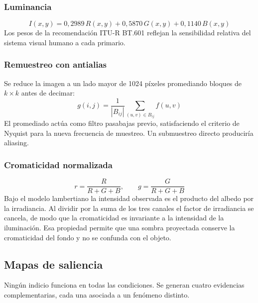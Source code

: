 \documentclass[conference]{IEEEtran}
\begin{document}
\subsubsection{Luminancia}
\begin{equation}
I(x,y) = 0{,}2989\,R(x,y) + 0{,}5870\,G(x,y) + 0{,}1140\,B(x,y)
\end{equation}
Los pesos de la recomendación ITU-R BT.601 reflejan la sensibilidad
relativa del sistema visual humano a cada primario.

\subsubsection{Remuestreo con antialias}
Se reduce la imagen a un lado mayor de 1024 píxeles promediando bloques
de $k \times k$ antes de decimar:
\begin{equation}
g(i,j) = \frac{1}{|B_{ij}|}\sum_{(u,v)\in B_{ij}} f(u,v)
\end{equation}
El promediado actúa como filtro pasabajas previo, satisfaciendo el
criterio de Nyquist para la nueva frecuencia de muestreo. Un
submuestreo directo produciría aliasing.

\subsubsection{Cromaticidad normalizada}
\begin{equation}
r = \frac{R}{R+G+B}, \qquad g = \frac{G}{R+G+B}
\end{equation}
Bajo el modelo lambertiano la intensidad observada es el producto del
albedo por la irradiancia. Al dividir por la suma de los tres canales
el factor de irradiancia se cancela, de modo que la cromaticidad es
invariante a la intensidad de la iluminación. Esa propiedad permite que
una sombra proyectada conserve la cromaticidad del fondo y no se
confunda con el objeto.

\subsection{Mapas de saliencia}

Ningún indicio funciona en todas las condiciones. Se generan cuatro
evidencias complementarias, cada una asociada a un fenómeno distinto.
\end{document}
